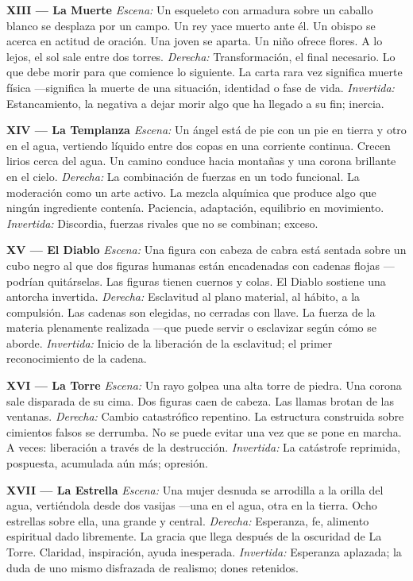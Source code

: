 \textbf{XIII --- La Muerte} \emph{Escena:} Un esqueleto con armadura sobre un caballo blanco se desplaza por un campo. Un rey yace muerto ante él. Un obispo se acerca en actitud de oración. Una joven se aparta. Un niño ofrece flores. A lo lejos, el sol sale entre dos torres. \emph{Derecha:} Transformación, el final necesario. Lo que debe morir para que comience lo siguiente. La carta rara vez significa muerte física ---significa la muerte de una situación, identidad o fase de vida. \emph{Invertida:} Estancamiento, la negativa a dejar morir algo que ha llegado a su fin; inercia.

\textbf{XIV --- La Templanza} \emph{Escena:} Un ángel está de pie con un pie en tierra y otro en el agua, vertiendo líquido entre dos copas en una corriente continua. Crecen lirios cerca del agua. Un camino conduce hacia montañas y una corona brillante en el cielo. \emph{Derecha:} La combinación de fuerzas en un todo funcional. La moderación como un arte activo. La mezcla alquímica que produce algo que ningún ingrediente contenía. Paciencia, adaptación, equilibrio en movimiento. \emph{Invertida:} Discordia, fuerzas rivales que no se combinan; exceso.

\textbf{XV --- El Diablo} \emph{Escena:} Una figura con cabeza de cabra está sentada sobre un cubo negro al que dos figuras humanas están encadenadas con cadenas flojas ---podrían quitárselas. Las figuras tienen cuernos y colas. El Diablo sostiene una antorcha invertida. \emph{Derecha:} Esclavitud al plano material, al hábito, a la compulsión. Las cadenas son elegidas, no cerradas con llave. La fuerza de la materia plenamente realizada ---que puede servir o esclavizar según cómo se aborde. \emph{Invertida:} Inicio de la liberación de la esclavitud; el primer reconocimiento de la cadena.

\textbf{XVI --- La Torre} \emph{Escena:} Un rayo golpea una alta torre de piedra. Una corona sale disparada de su cima. Dos figuras caen de cabeza. Las llamas brotan de las ventanas. \emph{Derecha:} Cambio catastrófico repentino. La estructura construida sobre cimientos falsos se derrumba. No se puede evitar una vez que se pone en marcha. A veces: liberación a través de la destrucción. \emph{Invertida:} La catástrofe reprimida, pospuesta, acumulada aún más; opresión.

\textbf{XVII --- La Estrella} \emph{Escena:} Una mujer desnuda se arrodilla a la orilla del agua, vertiéndola desde dos vasijas ---una en el agua, otra en la tierra. Ocho estrellas sobre ella, una grande y central. \emph{Derecha:} Esperanza, fe, alimento espiritual dado libremente. La gracia que llega después de la oscuridad de La Torre. Claridad, inspiración, ayuda inesperada. \emph{Invertida:} Esperanza aplazada; la duda de uno mismo disfrazada de realismo; dones retenidos.

